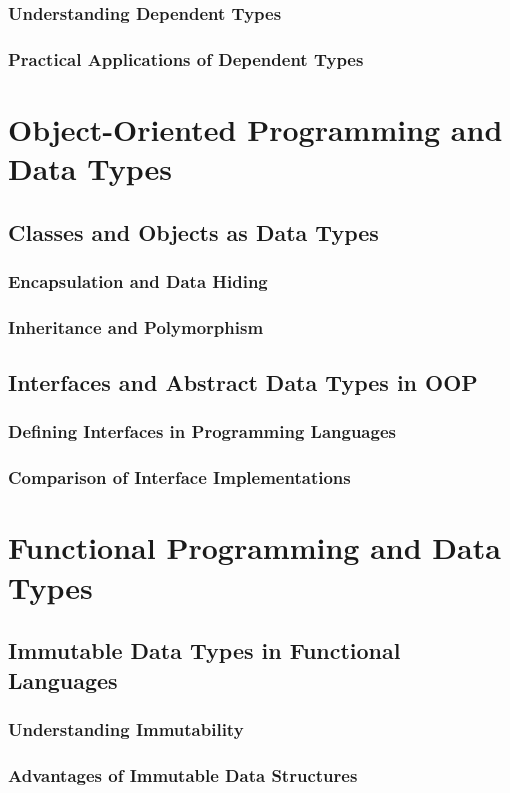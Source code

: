 \documentclass[12pt, oneside]{book}
\begin{document}
\subsubsection{Understanding Dependent Types}
\subsubsection{Practical Applications of Dependent Types}

\section{Object-Oriented Programming and Data Types}
\subsection{Classes and Objects as Data Types}
\subsubsection{Encapsulation and Data Hiding}
\subsubsection{Inheritance and Polymorphism}
\subsection{Interfaces and Abstract Data Types in OOP}
\subsubsection{Defining Interfaces in Programming Languages}
\subsubsection{Comparison of Interface Implementations}
\section{Functional Programming and Data Types}
\subsection{Immutable Data Types in Functional Languages}
\subsubsection{Understanding Immutability}
\subsubsection{Advantages of Immutable Data Structures}
\end{document}
